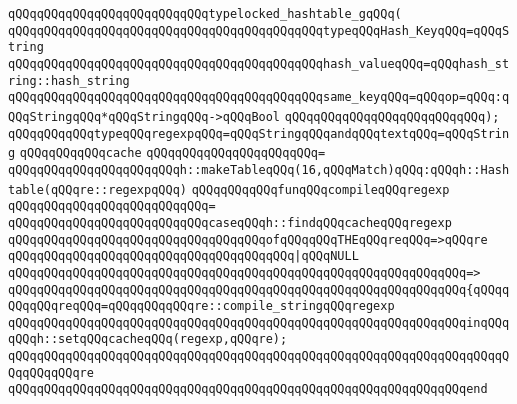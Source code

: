 \verb|qQQqqQQqqQQqqQQqqQQqqQQqqQQqtypelocked_hashtable_gqQQq(|\newline
\verb|qQQqqQQqqQQqqQQqqQQqqQQqqQQqqQQqqQQqqQQqqQQqtypeqQQqHash_KeyqQQq=qQQqString|\newline
\verb|qQQqqQQqqQQqqQQqqQQqqQQqqQQqqQQqqQQqqQQqqQQqhash_valueqQQq=qQQqhash_string::hash_string|\newline
\verb|qQQqqQQqqQQqqQQqqQQqqQQqqQQqqQQqqQQqqQQqqQQqsame_keyqQQq=qQQqop=qQQq:qQQqStringqQQq*qQQqStringqQQq->qQQqBool|\newline
\verb|qQQqqQQqqQQqqQQqqQQqqQQqqQQq);|\newline
\newline
\verb|qQQqqQQqqQQqtypeqQQqregexpqQQq=qQQqStringqQQqandqQQqtextqQQq=qQQqString|\newline
\newline
\newline
\verb|qQQqqQQqqQQqcache|\newline
\verb|qQQqqQQqqQQqqQQqqQQqqQQq=|\newline
\verb|qQQqqQQqqQQqqQQqqQQqqQQqh::makeTableqQQq(16,qQQqMatch)qQQq:qQQqh::Hashtable(qQQqre::regexpqQQq)|\newline
\newline
\verb|qQQqqQQqqQQqfunqQQqcompileqQQqregexp|\newline
\verb|qQQqqQQqqQQqqQQqqQQqqQQqqQQq=|\newline
\verb|qQQqqQQqqQQqqQQqqQQqqQQqqQQqcaseqQQqh::findqQQqcacheqQQqregexp|\newline
\newline
\verb|qQQqqQQqqQQqqQQqqQQqqQQqqQQqqQQqqQQqofqQQqqQQqTHEqQQqreqQQq=>qQQqre|\newline
\newline
\verb|qQQqqQQqqQQqqQQqqQQqqQQqqQQqqQQqqQQqqQQq|\verb#|qQQqNULL#\newline
\verb|qQQqqQQqqQQqqQQqqQQqqQQqqQQqqQQqqQQqqQQqqQQqqQQqqQQqqQQqqQQqqQQq=>|\newline
\verb|qQQqqQQqqQQqqQQqqQQqqQQqqQQqqQQqqQQqqQQqqQQqqQQqqQQqqQQqqQQqqQQq{qQQqqQQqqQQqreqQQq=qQQqqQQqqQQqre::compile_stringqQQqregexp|\newline
\verb|qQQqqQQqqQQqqQQqqQQqqQQqqQQqqQQqqQQqqQQqqQQqqQQqqQQqqQQqqQQqqQQqinqQQqqQQqh::setqQQqcacheqQQq(regexp,qQQqre);|\newline
\verb|qQQqqQQqqQQqqQQqqQQqqQQqqQQqqQQqqQQqqQQqqQQqqQQqqQQqqQQqqQQqqQQqqQQqqQQqqQQqqQQqre|\newline
\verb|qQQqqQQqqQQqqQQqqQQqqQQqqQQqqQQqqQQqqQQqqQQqqQQqqQQqqQQqqQQqqQQqend|\newline
